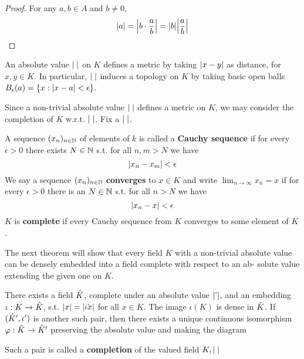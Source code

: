 \documentclass[11pt]{article}
\begin{document}
\begin{proof}
For any \(a,b\in A\) and \(b\neq 0\),
\begin{equation*}
\abs{a}=\abs{b\cdot\frac{a}{b}}=\abs{b}\abs{\frac{a}{b}}
\end{equation*}
\end{proof}

An absolute value \(\abs{\;}\) on \(K\) defines a metric by taking \(\abs{x-y}\) as distance,
for \(x,y\in K\). In particular, \(\abs{\;}\) induces a topology on \(K\) by taking basic open
balls \(B_\epsilon(a)=\{x:\abs{x-a}<\epsilon\}\).

Since a non-trivial absolute value \(\abs{\;}\) defines a metric on \(K\), we may consider the
completion of \(K\) w.r.t. \(\abs{\;}\). Fix a \(\abs{\;}\).

A sequence \((x_n)_{n\in\mathbb{N}}\) of elements of \(k\) is called a \textbf{Cauchy sequence} if for every \(\epsilon>0\)
there exists \(N\in\mathbb{N}\) s.t. for all \(n,m>N\) we have
\begin{equation*}
\abs{x_n-x_m}<\epsilon
\end{equation*}
We say a sequence \((x_n)_{n\in\mathbb{N}}\) \textbf{converges} to \(x\in K\)  and write \(\lim_{n\to\infty}x_n=x\) if for
every \(\epsilon>0\) there is an \(N\in\mathbb{N}\) s.t. for all \(n>N\) we have
\begin{equation*}
\abs{x_n-x}<\epsilon
\end{equation*}
\(K\) is \textbf{complete} if every Cauchy sequence from \(K\) converges to some element of \(K\).

The next theorem will show that every field \(K\) with a non-trivial absolute value can be densely
embedded into a field complete with respect to an ab- solute value extending the given one
on \(K\).

\begin{theorem}[]
\label{1.1.4}
There exists a field \(\hat{K}\), complete under an absolute value \(\abs{\hat{\;}}\), and an
embedding \(\iota:K\to\hat{K}\), s.t. \(\abs{x}=\abs{\hat{\iota{x}}}\) for all \(x\in K\). The image \(\iota(K)\)
is dense in \(\hat{K}\). If \((\hat{K}',\iota')\) is another such pair, then there exists a unique
continuous isomorphism \(\varphi:\hat{K}\to\hat{K}'\) preserving the absolute value and making  the diagram
\begin{center}\end{center}
Such a pair is called a \textbf{completion} of the valued field \(K,\abs{\;}\)
\end{theorem}
\end{document}
